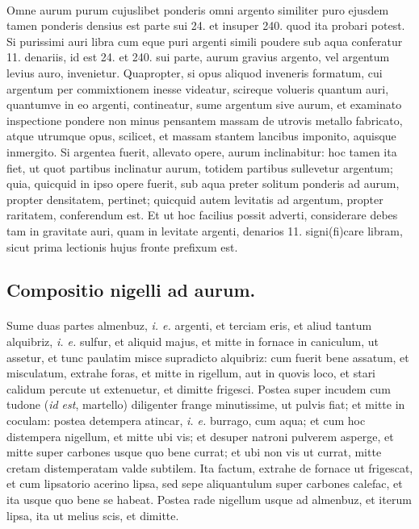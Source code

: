 \documentclass[a4paper, 11pt, oneside, polutonikogreek, italian]{article}
\begin{document}
\paragraph{}
Omne aurum purum cujuslibet ponderis omni argento similiter puro ejusdem tamen ponderis densius est parte sui 24. et insuper 240. quod ita probari potest. Si purissimi auri libra cum eque puri argenti simili poudere sub aqua conferatur 11. denariis, id est 24. et 240. sui parte, aurum gravius argento, vel argentum levius auro, invenietur. Quapropter, si opus aliquod inveneris formatum, cui argentum per commixtionem inesse videatur, scireque volueris quantum auri, quantumve in eo argenti, contineatur, sume argentum sive aurum, et examinato inspectione pondere non minus pensantem massam de utrovis metallo fabricato, atque utrumque opus, scilicet, et massam stantem lancibus imponito, aquisque inmergito. Si argentea fuerit, allevato opere, aurum inclinabitur: hoc tamen ita fiet, ut quot partibus inclinatur aurum, totidem partibus sullevetur argentum; quia, quicquid in ipso opere fuerit, sub aqua preter solitum ponderis ad aurum, propter densitatem, pertinet; quicquid autem levitatis ad argentum, propter raritatem, conferendum est. Et ut hoc facilius possit adverti, considerare debes tam in gravitate auri, quam in levitate argenti, denarios 11. signi(fi)care libram, sicut prima lectionis hujus fronte prefixum est.

\subsection{Compositio nigelli ad aurum.}
\paragraph{}
Sume duas partes almenbuz, \emph{i. e.} argenti, et terciam eris, et aliud tantum alquibriz, \emph{i. e.} sulfur, et aliquid majus, et mitte in fornace in caniculum, ut assetur, et tunc paulatim misce supradicto alquibriz: cum fuerit bene assatum, et misculatum, extrahe foras, et mitte in rigellum, aut in quovis loco, et stari calidum percute ut extenuetur, et dimitte frigesci. Postea super incudem cum tudone (\emph{id est}, martello) diligenter frange minutissime, ut pulvis fiat; et mitte in coculam: postea detempera atincar, \emph{i. e.} burrago, cum aqua; et cum hoc distempera nigellum, et mitte ubi vis; et desuper natroni pulverem asperge, et mitte super carbones usque quo bene currat; et ubi non vis ut currat, mitte cretam distemperatam valde subtilem. Ita factum, extrahe de fornace ut frigescat, et cum lipsatorio acerino lipsa, sed sepe aliquantulum super carbones calefac, et ita usque quo bene se habeat. Postea rade nigellum usque ad almenbuz, et iterum lipsa, ita ut melius scis, et dimitte.
\end{document}
